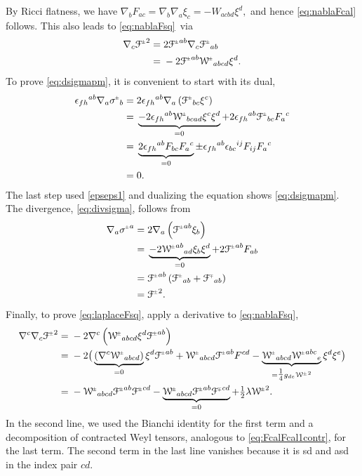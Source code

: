 \documentclass[a4paper,11pt,reqno]{amsart}
\theoremstyle{plain}
\newcommand{\PM}[1]{{{#1}^{\hspace{-.5pt}\scaleto{\pm}{3.5pt}}}}
\newcommand{\MP}[1]{{{#1}^{\hspace{-.5pt}\scaleto{\mp}{3.5pt}}}}
\def\Wcal{\mathcal{W}}
\def\Fcal{\mathcal{F}}
\numberwithin{equation}{section}
\begin{document}
By Ricci flatness, we have $\nabla_{b} F_{ac} = \nabla_{b}\nabla_{a}\xi_{c} = - W_{acbd} \xi^{d}, $ and hence \eqref{eq:nablaFcal} follows. This also leads to \eqref{eq:nablaFsq}\ via
\begin{align*}
\nabla_{c}\PM{\Fcal}^2
={}&2 \PM{\Fcal}^{ab}\nabla_{c}\PM{\Fcal}_{ab} \\
={}&- 2 \PM{\Fcal}^{ab}\PM{\Wcal}_{abcd} \xi^{d}.
\end{align*}
To prove \eqref{eq:dsigmapm}, it is convenient to start with its dual,
\begin{align*}
\epsilon_{fh}{}^{ab} \nabla_{a}\PM{\sigma}_{b} 
={}& 2\epsilon_{fh}{}^{ab} \nabla_{a}\left( \PM{\Fcal}_{bc}\xi^c \right) \\
={}& \underbrace{ -2 \epsilon_{fh}{}^{ab}\PM{\Wcal}_{bcad}\xi^c \xi^d}_{=0} + 2\epsilon_{fh}{}^{ab}\PM{\Fcal}_{bc} F_a{}^c \\
={}&  \underbrace{ 2 \epsilon_{fh}{}^{ab}  F_{bc} F_a{}^c}_{=0}  \pm \epsilon_{fh}{}^{ab}  \epsilon_{bc}{}^{ij} F_{ij}  F_a{}^c \\
={}& 0.
\end{align*}
The last step used \eqref{epseps1} and dualizing the equation shows \eqref{eq:dsigmapm}. The divergence, \eqref{eq:divsigma}, follows from
\begin{align*}
\nabla_{a}\PM{\sigma}^{a}
={}& 2 \nabla_{a} \left( \PM{\Fcal}^{ab}\xi_{b}\right)\\
={}& \underbrace{-2\PM{\Wcal}^{ab}{}_{ad}\xi_{b}\xi^d}_{=0} +  2\PM{\Fcal}^{ab} F_{ab} \\
={}& \PM{\Fcal}^{ab} \left( \PM{\Fcal}_{ab} + \MP{\Fcal}_{ab} \right) \\
={}&\PM{\Fcal}^2.
\end{align*}
Finally, to prove \eqref{eq:laplaceFsq}, apply a derivative to \eqref{eq:nablaFsq},
\begin{align*}
\nabla^{c}\nabla_{c}\PM{\Fcal}^2
={}&-2 \nabla^{c} \left( \PM{\Wcal}_{abcd} \xi^{d}\PM{\Fcal}^{ab} \right) \\
={}& -2 \big( \underbrace{(\nabla^{c} \PM{\Wcal}_{abcd})}_{=0} \xi^{d}\PM{\Fcal}^{ab} +\PM{\Wcal}_{abcd} \PM{\Fcal}^{ab} F^{cd}  - \underbrace{\PM{\Wcal}_{abcd}  \PM{\Wcal}^{abc}{}_{e}}_{= \tfrac{1}{4} g_{de}\PM{\Wcal}^2} \xi^{d} \xi^e \big) \\
={}& - \PM{\Wcal}_{abcd} \PM{\Fcal}^{ab}  \PM{\Fcal}^{cd} - \underbrace{\PM{\Wcal}_{abcd} \PM{\Fcal}^{ab}  \MP{\Fcal}^{cd}}_{=0} +\tfrac{1}{2} \lambda \PM{\Wcal}^2.
\end{align*}
In the second line, we used the Bianchi identity for the first term and a decomposition of contracted Weyl tensors, analogous to \eqref{eq:FcalFcal1contr}, for the last term. The second term in the last line vanishes because it is sd and asd in the index pair $cd$.
%
\end{document}

